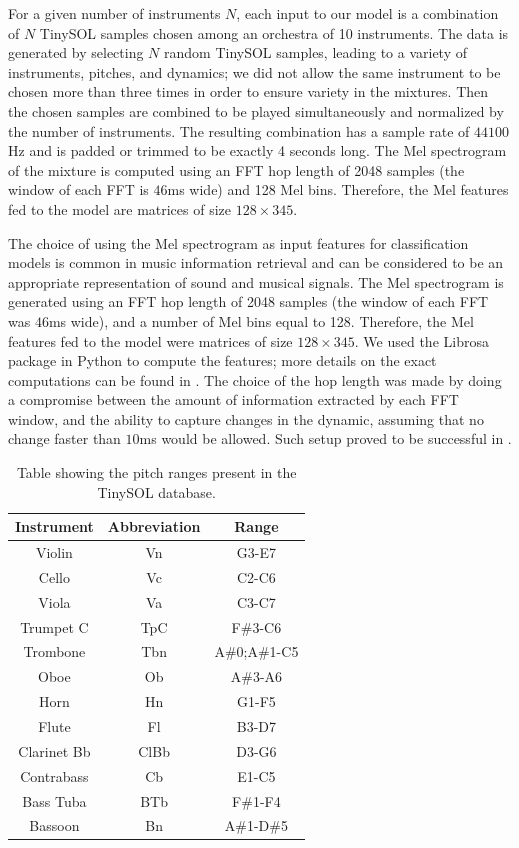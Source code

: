 \documentclass[runningheads,a4paper]{llncs}
\begin{document}
For a given number of instruments $N$, each input to our model is a combination of $N$ TinySOL samples chosen among an orchestra of 10 instruments. The data is generated by selecting $N$ random TinySOL samples, leading to a variety of instruments, pitches, and dynamics; we did not allow the same instrument to be chosen more than three times in order to ensure variety in the mixtures. Then the chosen samples are combined to be played simultaneously and normalized by the number of instruments. The resulting combination has a sample rate of $44100$Hz and is padded or trimmed to be exactly 4 seconds long. The Mel spectrogram of the mixture is computed using an FFT hop length of 2048 samples (the window of each FFT is $46$ms wide) and 128 Mel bins. Therefore, the Mel features fed to the model are matrices of size $128\times 345$.

The choice of using the Mel spectrogram as input features for classification models is common in music information retrieval \cite{McKinney2003} and can be considered to be an appropriate representation of sound and musical signals. The Mel spectrogram is generated using an FFT hop length of 2048 samples (the window of each FFT was $46$ms wide), and a number of Mel bins equal to 128. Therefore, the Mel features fed to the model were matrices of size $128\times 345$. We used the Librosa package in Python to compute the features; more details on the exact computations can be found in \cite{mcfee15}. The choice of the hop length was made by doing a compromise between the amount of information extracted by each FFT window, and the ability to capture changes in the dynamic, assuming that no change faster than $10$ms would be allowed.
Such setup proved to be successful in \cite{Salamon17}.

\begin{table}
\begin{center}
\begin{tabular}{|c|c|c|}
\hline
\textbf{Instrument} & \textbf{Abbreviation} & \textbf{Range} \\
\hline
Violin & Vn & G3-E7\\
Cello & Vc & C2-C6\\
Viola & Va & C3-C7\\
Trumpet C & TpC & F\#3-C6\\
Trombone & Tbn & A\#0;A\#1-C5\\
Oboe & Ob & A\#3-A6\\
Horn & Hn & G1-F5\\
Flute & Fl & B3-D7\\
Clarinet Bb & ClBb & D3-G6\\
Contrabass & Cb & E1-C5\\
Bass Tuba & BTb & F\#1-F4\\
Bassoon & Bn & A\#1-D\#5\\
\hline
\end{tabular}
\caption{Table showing the pitch ranges present in the TinySOL database.\label{tab:ranges}}
\end{center}
\end{table}
\end{document}
